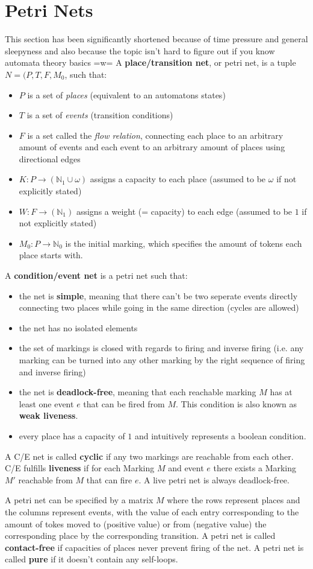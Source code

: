 \documentclass{report}
\newcommand{\tbf}{\textbf}
\newcommand*{\newpar}{\par\vspace{\baselineskip}\noindent} %
\begin{document}
\section{Petri Nets}
This section has been significantly shortened because of time pressure and general sleepyness and also because the topic isn't hard to figure out if you know automata theory basics =w=
\newpage
A \tbf{place/transition net}, or petri net, is a tuple $N = (P, T, F, M_0$, such that:
\begin{itemize}
 \item $P$ is a set of \textit{places} (equivalent to an automatons states)
 \item $T$ is a set of \textit{events} (transition conditions)
 \item $F$ is a set called the \textit{flow relation}, connecting each place to an arbitrary amount of events and each event to an arbitrary amount of places using directional edges
 \item $K: P \to (\mathbb{N}_1 \cup \omega)$ assigns a capacity to each place (assumed to be $\omega$ if not explicitly stated)
 \item $W: F \to (\mathbb{N}_1)$ assigns a weight (= capacity) to each edge (assumed to be $1$ if not explicitly stated)
 \item $M_0: P \to \mathbb{N}_0$ is the initial marking, which specifies the amount of tokens each place starts with.
\end{itemize}
\newpar
A \tbf{condition/event net} is a petri net such that:
\begin{itemize}
 \item the net is \tbf{simple}, meaning that there can't be two seperate events directly connecting two places while going in the same direction (cycles are allowed)
 \item the net has no isolated elements
 \item the set of markings is closed with regards to firing and inverse firing (i.e. any marking can be turned into any other marking by the right sequence of firing and inverse firing)
 \item the net is \tbf{deadlock-free}, meaning that each reachable marking $M$ has at least one event $e$ that can be fired from $M$. This condition is also known as \tbf{weak liveness}.
 \item every place has a capacity of $1$ and intuitively represents a boolean condition.
\end{itemize}
A C/E net is called \tbf{cyclic} if any two markings are reachable from each other. C/E fulfills \tbf{liveness} if for each Marking $M$ and event $e$ there exists a Marking $M'$ reachable from $M$ that can fire $e$. A live petri net is always deadlock-free.
\newpar
A petri net can be specified by a matrix $M$ where the rows represent places and the columns represent events, with the value of each entry corresponding to the amount of tokes moved to (positive value) or from (negative value) the corresponding place by the corresponding transition. A petri net is called \tbf{contact-free} if capacities of places never prevent firing of the net. A petri net is called \tbf{pure} if it doesn't contain any self-loops.
\clearpage
\end{document}
